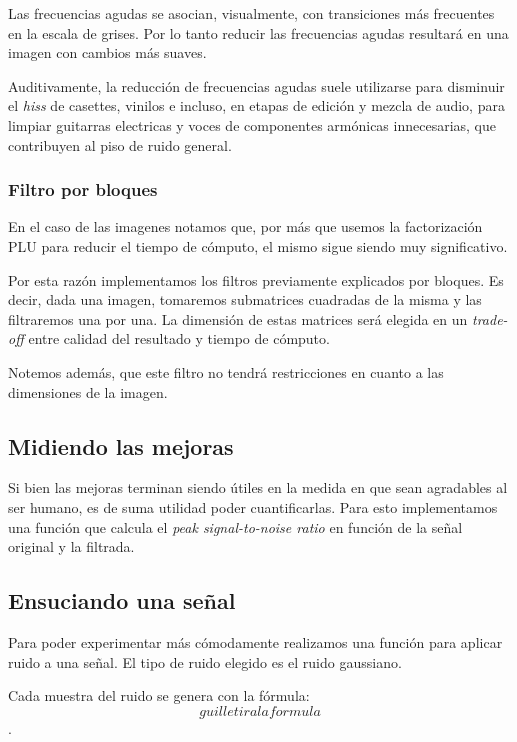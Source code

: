 Las frecuencias agudas se asocian, visualmente, con transiciones
m\'as frecuentes en la escala
de grises. Por lo tanto reducir las frecuencias agudas resultar\'a en
una imagen con cambios m\'as suaves.

Auditivamente, la reducci\'on de frecuencias agudas suele utilizarse
para disminuir el {\em hiss} de casettes, vinilos e incluso, en etapas
de edici\'on y mezcla de audio, para limpiar guitarras electricas y voces
de componentes arm\'onicas innecesarias, que contribuyen al piso de ruido
general.

\subsubsection{Filtro por bloques}

En el caso de las imagenes notamos que, por m\'as que usemos la
factorizaci\'on PLU para reducir el tiempo de c\'omputo, el mismo
sigue siendo muy significativo.

Por esta raz\'on implementamos los filtros previamente explicados
por bloques.
Es decir, dada una imagen, tomaremos submatrices cuadradas de la
misma y las filtraremos una por una. La dimensi\'on de estas
matrices ser\'a elegida en un {\em trade-off} entre calidad del
resultado y tiempo de c\'omputo.

Notemos adem\'as, que este filtro no tendr\'a restricciones en
cuanto a las dimensiones de la imagen.

\subsection{Midiendo las mejoras}

Si bien las mejoras terminan siendo \'utiles en la medida en que sean
agradables al ser humano, es de suma utilidad poder cuantificarlas.
Para esto implementamos una funci\'on que calcula el
{\em peak signal-to-noise ratio} en funci\'on de la se\~nal original
y la filtrada.

\subsection{Ensuciando una se\~nal}

Para poder experimentar m\'as c\'omodamente realizamos una 
funci\'on para aplicar ruido a una se\~nal.
El tipo de ruido elegido es el ruido gaussiano.

Cada muestra del ruido se genera con la f\'ormula:
$$ guille tira la formula $$.

